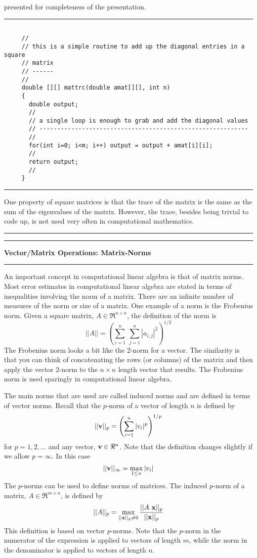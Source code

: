 \documentclass[10pt,fleqn]{article}
\begin{document}
presented for completeness of the presentation.
\vskip0.1in\hrule\vskip0.1in
\begin{verbatim}

     //
     // this is a simple routine to add up the diagonal entries in a square
     // matrix
     // ------
     //
     double [][] mattrc(double amat[][], int n)
     {
       double output;
       //
       // a single loop is enough to grab and add the diagonal values
       // -----------------------------------------------------------
       //
       for(int i=0; i<m; i++) output = output + amat[i][i];
       //
       return output;
       //
     }

\end{verbatim}
\vskip0.1in\hrule\vskip0.1in
One property of square matrices is that the trace of the matrix is the same as
the sum of the eigenvalues of the matrix. However, the trace, besides being
trivial to code up, is not used very often in computational mathematics.
\vskip0.1in\hrule\vskip0.1in
\newpage
\vskip0.1in\hrule\vskip0.1in
\noindent
{\bf Vector/Matrix Operations: Matrix-Norms}
\vskip0.1in\hrule\vskip0.1in
\noindent
An important concept in computational linear algebra is that of matrix norms.
Most error estimates in computational linear algebra are stated in terms of
inequalities involving the norm of a matrix. There are an infinite number of
measures of the norm or size of a matrix. One example of a norm is the Frobenius
norm. Given a square matrix, $A\in\Re^{n\times n}$, the definition of the norm
is
$$
  || A || = \left( \sum_{i=1}^n\ \sum_{j=1}^n | a_{i,j} |^2 \right)^{1/2}
$$
The Frobenius norm looks a bit like the $2$-norm for a vector. The similarity is
that you can think of concatenating the rows (or columns) of the matrix and then
apply the vector $2$-norm to the $n\times n$ length vector that results. The
Frobenius norm is used sparingly in computational linear algebra.

The main norms that are used are called induced norms and are defined in terms
of vector norms. Recall that the $p$-norm of a vector of length $n$ is defined
by
$$
  || {\bf v} ||_p = \left( \sum_{i=1}^n | v_i |^p \right)^{1/p}
$$
for $p=1, 2, \ldots$ and any vector, ${\bf v}\in\Re^n$. Note that the definition
changes slightly if we allow $p=\infty$. In this case
$$
  || {\bf v} ||_\infty = \max_{1\leq n} | v_i |
$$
The $p$-norms can be used to define norms of matrices. The induced $p$-norm of a
matrix, $A\in\Re^{m\times n}$, is defined by
$$
  || A ||_p = \max_{ || {\bf x} ||_p \neq 0 }
      {{
        || A\ {\bf x} ||_p
      }\over{
        || {\bf x} ||_p
      }}
$$ 
This definition is based on vector $p$-norms. Note that the $p$-norm in the
numerator of the expression is applied to vectors of length $m$, while the norm
in the denominator is applied to vectors of length $n$.
\end{document}
